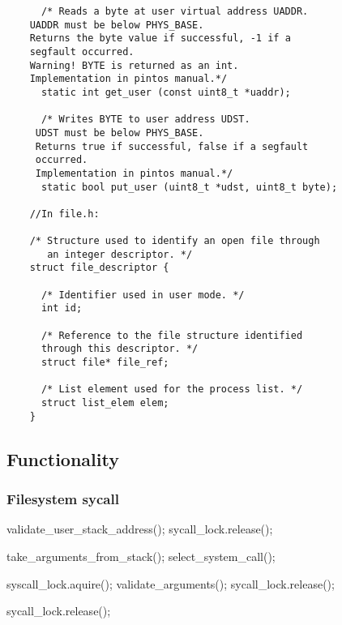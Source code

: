 \begin{lstlisting}
      /* Reads a byte at user virtual address UADDR.
	UADDR must be below PHYS_BASE.
	Returns the byte value if successful, -1 if a 
	segfault occurred. 
	Warning! BYTE is returned as an int.
	Implementation in pintos manual.*/
      static int get_user (const uint8_t *uaddr);

      /* Writes BYTE to user address UDST.
	 UDST must be below PHYS_BASE.
	 Returns true if successful, false if a segfault 
	 occurred. 
	 Implementation in pintos manual.*/
      static bool put_user (uint8_t *udst, uint8_t byte);

    //In file.h:
    
    /* Structure used to identify an open file through 
       an integer descriptor. */
    struct file_descriptor {

      /* Identifier used in user mode. */
      int id;
      
      /* Reference to the file structure identified 
      through this descriptor. */
      struct file* file_ref;
    
      /* List element used for the process list. */
      struct list_elem elem;
    }
    \end{lstlisting}


    \subsection{Functionality}

    \subsubsection{Filesystem sycall}
    \vspace{-3em} %
      \begin{program}

	validate\_user\_stack\_address();
	\IF {}
	  \THEN sycall\_lock.release();
	\FI

	take\_arguments\_from\_stack();
	select\_system\_call();
	
	syscall\_lock.aquire();
	validate\_arguments();
	\IF {}
	  \THEN sycall\_lock.release();
	\FI
	

	\IF {}
	  \THEN sycall\_lock.release();
	\FI


      \end{program}

